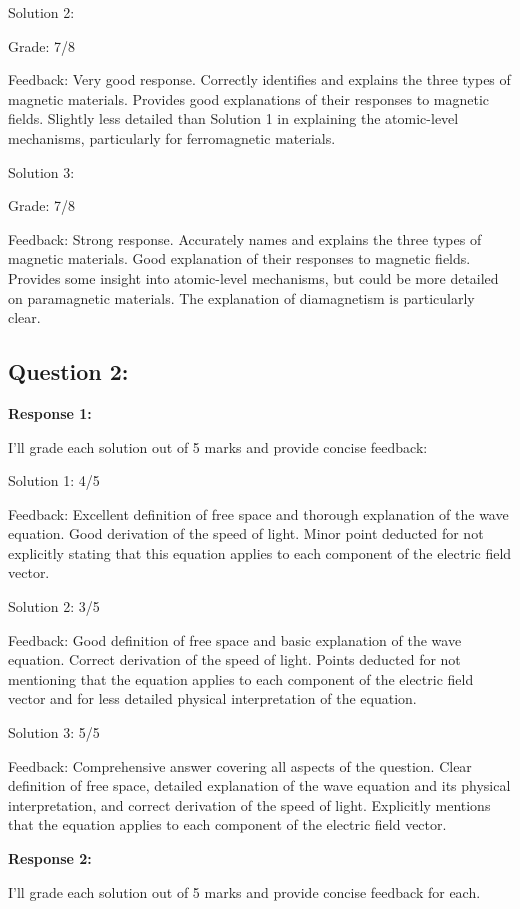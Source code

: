 \documentclass[a4paper,11pt]{article}
\begin{document}
Solution 2:

Grade: 7/8

Feedback: Very good response. Correctly identifies and explains the three types of magnetic materials. Provides good explanations of their responses to magnetic fields. Slightly less detailed than Solution 1 in explaining the atomic-level mechanisms, particularly for ferromagnetic materials.

Solution 3:

Grade: 7/8

Feedback: Strong response. Accurately names and explains the three types of magnetic materials. Good explanation of their responses to magnetic fields. Provides some insight into atomic-level mechanisms, but could be more detailed on paramagnetic materials. The explanation of diamagnetism is particularly clear.

\subsection*{Question 2:}

\textbf{Response 1:}

I'll grade each solution out of 5 marks and provide concise feedback:

Solution 1: 4/5

Feedback: Excellent definition of free space and thorough explanation of the wave equation. Good derivation of the speed of light. Minor point deducted for not explicitly stating that this equation applies to each component of the electric field vector.

Solution 2: 3/5

Feedback: Good definition of free space and basic explanation of the wave equation. Correct derivation of the speed of light. Points deducted for not mentioning that the equation applies to each component of the electric field vector and for less detailed physical interpretation of the equation.

Solution 3: 5/5

Feedback: Comprehensive answer covering all aspects of the question. Clear definition of free space, detailed explanation of the wave equation and its physical interpretation, and correct derivation of the speed of light. Explicitly mentions that the equation applies to each component of the electric field vector.

\bigskip
\textbf{Response 2:}

I'll grade each solution out of 5 marks and provide concise feedback for each.
\end{document}
